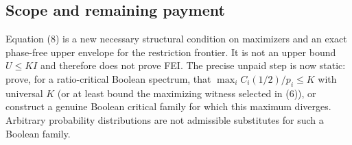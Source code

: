 \subsection*{Scope and remaining payment}

Equation (8) is a new necessary structural condition on maximizers and an
exact phase-free upper envelope for the restriction frontier.  It is not an
upper bound $U\le KI$ and therefore does not prove FEI.  The precise unpaid
step is now static: prove, for a ratio-critical Boolean spectrum, that
$\max_i C_i(1/2)/p_i\le K$ with universal $K$ (or at least bound the
maximizing witness selected in (6)), or construct a genuine Boolean critical
family for which this maximum diverges.
Arbitrary probability distributions are not admissible substitutes for such a
Boolean family.
